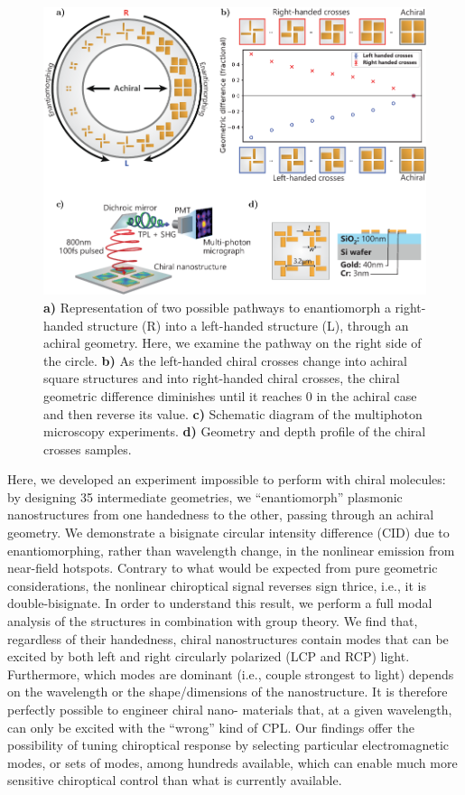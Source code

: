 \begin{figure}[htb]	
    \centering	
    \includegraphics[scale=1]{./figures/results/EnantiomorphingChiralCrosses/setup.pdf}
    \caption{\label{fig:results:EnantiomorphingChiralCrosses:setup}
    \textbf{a)} Representation of two possible pathways to enantiomorph a right-handed structure (R) into a left-handed structure (L), through an achiral geometry. Here, we examine the pathway on the right side of the circle. \textbf{b)} As the left-handed chiral crosses change into achiral square structures and into right-handed chiral crosses, the chiral geometric difference diminishes until it reaches 0 in the achiral case and then reverse its value. \textbf{c)} Schematic diagram of the multiphoton microscopy experiments. \textbf{d)} Geometry and depth profile of the chiral crosses samples.}	
\end{figure}

Here, we developed an experiment impossible to perform with chiral molecules: by designing 35 intermediate geometries, we ``enantiomorph'' plasmonic nanostructures from one handedness to the other, passing through an achiral geometry. 
We demonstrate a bisignate circular intensity difference (CID) due to enantiomorphing, rather than wavelength change, in the nonlinear emission from near-field hotspots. Contrary to what would be expected from pure geometric considerations, the nonlinear chiroptical signal reverses sign thrice, i.e., it is double-bisignate. In order to understand this result, we perform a full modal analysis of the structures in combination with group theory. 
We find that, regardless of their handedness, chiral nanostructures contain modes that can be excited by both left and right circularly polarized (LCP and RCP) light. Furthermore, which modes are dominant (i.e., couple strongest to light) depends on the wavelength or the shape/dimensions of the nanostructure. It is therefore perfectly possible to engineer chiral nano- materials that, at a given wavelength, can only be excited with the ``wrong'' kind of CPL. 
Our findings offer the possibility of tuning chiroptical response by selecting particular electromagnetic modes, or sets of modes, among hundreds available, which can enable much more sensitive chiroptical control than what is currently available.

